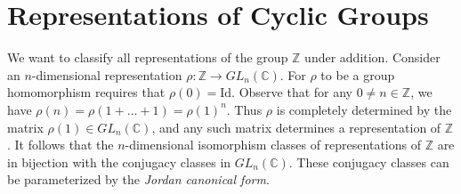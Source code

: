 %
\section{Representations of Cyclic Groups}
\begin{example}
We want to classify all representations of the group $\mathbb{Z}$ under addition.  Consider an $n$-dimensional representation $\rho \colon \mathbb{Z} \to GL_n (\mathbb{C})$.  For $\rho$ to be a group homomorphism requires that $\rho(0) = \text{Id}$.  Observe that for any $0 \neq n \in \mathbb{Z}$, we have $\rho(n) = \rho( 1 + \ldots + 1) = \rho(1)^n$.  Thus $\rho$ is completely determined by the matrix $\rho(1) \in GL_n(\mathbb{C})$, and any such matrix determines a representation of $\mathbb{Z}$.  It follows that the $n$-dimensional isomorphism classes of representations of $\mathbb{Z}$ are in bijection with the conjugacy classes in $GL_n(\mathbb{C})$.  These conjugacy classes can be parameterized by the \textit{Jordan canonical form}.
\end{example}

